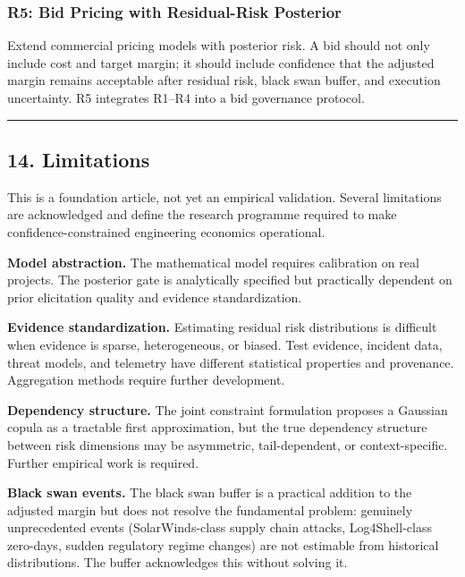 \documentclass[
]{article}
\begin{document}
\subsubsection{R5: Bid Pricing with Residual-Risk
Posterior}\label{r5-bid-pricing-with-residual-risk-posterior}

Extend commercial pricing models with posterior risk. A bid should not
only include cost and target margin; it should include confidence that
the adjusted margin remains acceptable after residual risk, black swan
buffer, and execution uncertainty. R5 integrates R1--R4 into a bid
governance protocol.

\begin{center}\rule{0.5\linewidth}{0.5pt}\end{center}

\subsection{14. Limitations}\label{limitations}

This is a foundation article, not yet an empirical validation. Several
limitations are acknowledged and define the research programme required
to make confidence-constrained engineering economics operational.

\textbf{Model abstraction.} The mathematical model requires calibration
on real projects. The posterior gate is analytically specified but
practically dependent on prior elicitation quality and evidence
standardization.

\textbf{Evidence standardization.} Estimating residual risk
distributions is difficult when evidence is sparse, heterogeneous, or
biased. Test evidence, incident data, threat models, and telemetry have
different statistical properties and provenance. Aggregation methods
require further development.

\textbf{Dependency structure.} The joint constraint formulation proposes
a Gaussian copula as a tractable first approximation, but the true
dependency structure between risk dimensions may be asymmetric,
tail-dependent, or context-specific. Further empirical work is required.

\textbf{Black swan events.} The black swan buffer is a practical
addition to the adjusted margin but does not resolve the fundamental
problem: genuinely unprecedented events (SolarWinds-class supply chain
attacks, Log4Shell-class zero-days, sudden regulatory regime changes)
are not estimable from historical distributions. The buffer acknowledges
this without solving it.
\end{document}
